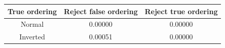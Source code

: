 \begin{tabular}{| c | c | c |}
\hline
True ordering & Reject false ordering & Reject true ordering \\
\hline
Normal & 0.00000 & 0.00000 \\
Inverted & 0.00051 & 0.00000 \\
\hline
\end{tabular}
